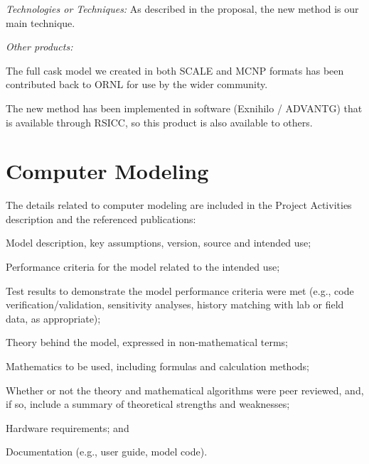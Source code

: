 \documentclass[12pt]{article}
\begin{document}
\textit{Technologies or Techniques:} As described in the proposal, the new method is our main technique. 

\textit{Other products:} 
\begin{compactitem}
\item The full cask model we created in both SCALE and MCNP formats has been contributed back to ORNL for use by the wider community.

\item The new method has been implemented in software (Exnihilo / ADVANTG) that is available through RSICC, so this product is also available to others. 
\end{compactitem}


\section{Computer Modeling}
\label{sect::modeling}

The details related to computer modeling are included in the Project Activities description and the referenced publications:
\begin{compactitem}
\item Model description, key assumptions, version, source and intended use;
\item Performance criteria for the model related to the intended use;
\item Test results to demonstrate the model performance criteria were met (e.g., code
verification/validation, sensitivity analyses, history matching with lab or field data, as
appropriate);
\item Theory behind the model, expressed in non‐mathematical terms;
\item Mathematics to be used, including formulas and calculation methods;
\item Whether or not the theory and mathematical algorithms were peer reviewed, and, if so,
include a summary of theoretical strengths and weaknesses;
\item Hardware requirements; and
\item Documentation (e.g., user guide, model code).
\end{compactitem}
\end{document}
